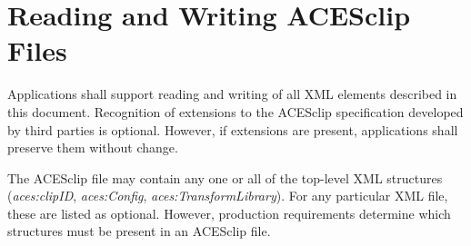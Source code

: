 \section{Reading and Writing ACESclip Files}
Applications shall support reading and writing of all XML elements described in this document. Recognition of extensions to the ACESclip specification developed by third parties is optional. However, if extensions are present, applications shall preserve them without change.

The ACESclip file may contain any one or all of the top-level XML structures (\textit{aces:clipID}, \textit{aces:Config}, \textit{aces:TransformLibrary}). For any particular XML file, these are listed as optional. However, production requirements determine which structures must be present in an ACESclip file.